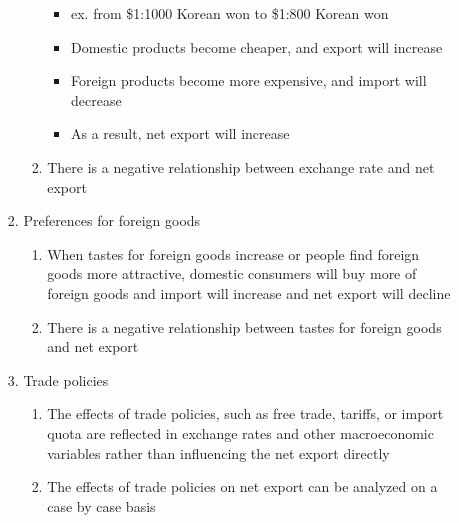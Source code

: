 \documentclass[12pt]{article}
\begin{document}
\begin{enumerate}
\begin{enumerate}
\begin{enumerate}
\begin{enumerate}
                    \begin{itemize}

                      \item ex. from \$1:1000 Korean won to \$1:800 Korean won

                      \item Domestic products become cheaper, and export will increase

                      \item Foreign products become more expensive, and import will decrease

                      \item As a result, net export will increase

                    \end{itemize}

                  \item There is a negative relationship between exchange rate and net export

                \end{enumerate}

              \item Preferences for foreign goods

                \begin{enumerate}

                  \item When tastes for foreign goods increase or people find foreign goods more attractive, domestic consumers will buy more of foreign goods and import will increase and net export will decline

                  \item There is a negative relationship between tastes for foreign goods and net export

                \end{enumerate}

              \item Trade policies

                \begin{enumerate}

                  \item The effects of trade policies, such as free trade, tariffs, or import quota are reflected in exchange rates and other macroeconomic variables rather than influencing the net export directly

                  \item The effects of trade policies on net export can be analyzed on a case by case basis


\end{enumerate}
\end{enumerate}
\end{enumerate}
\end{enumerate}
\end{document}
